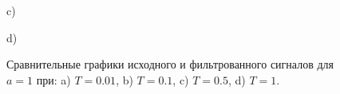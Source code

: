 \documentclass[a5paper, 10pt]{article}
\theoremstyle{definition}
\theoremstyle{plain}
\theoremstyle{remark}
\begin{document}
\begin{figure}[h!]
\begin{minipage}[h!]{0.47\linewidth}
 c) \\
\end{minipage}
\hfill
\begin{minipage}[h!]{0.47\linewidth}
 d) \\
\end{minipage}
\caption{Сравнительные графики исходного и фильтрованного сигналов для $a=1$ при: a) $T=0.01$, b)
$T=0.1$, c) $T=0.5$, d) $T=1$.}
\end{figure}
\end{document}
